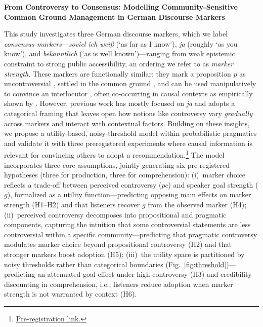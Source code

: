 \documentclass[12pt]{article}
\begin{document}
\noindent\textbf{\large From Controversy to Consensus: Modelling Community-Sensitive Common Ground Management in German Discourse Markers}


This study investigates three German discourse markers, which we label \emph{consensus markers}---\textit{soviel ich wei\ss} (`as far as I know'), \textit{ja} (roughly `as you know'), and \textit{bekanntlich} (`as is well known')---ranging from weak epistemic constraint to strong public accessibility, an ordering we refer to as \emph{marker strength}.
These markers are functionally similar: they mark a proposition $p$ as uncontroversial \citep{zimmermann2011discourse}, settled in the common ground \citep{repp2013common}, and can be used manipulatively to convince an interlocutor \citep{doring2016modal}, often co-occurring in causal contexts as empirically shown by \citep{seemann2025}.
However, previous work \citep[cf.][]{grosz2021discourse} has mostly focused on \textit{ja} and adopts a categorical framing that leaves open how notions like controversy vary \emph{gradually} across markers and interact with contextual factors.
Building on these insights, we propose a utility-based, noisy-threshold model within probabilistic pragmatics \citep{goodman2016pragmatic, franke2016probabilistic, degen2023rational} and validate it with three preregistered experiments where causal information is relevant for convincing others to adopt a recommendation.\footnote{\href{https://osf.io/8snhk/overview?view\_only=c11af15b84814625832957bd31f561bb}{Pre-registration link.}}
The model incorporates three core assumptions, jointly generating six pre-registered hypotheses (three for production, three for comprehension):
(i)~marker choice reflects a trade-off between perceived controversy ($pc$) and speaker goal strength ($g$), formalized as a utility function---predicting opposing main effects on marker strength (H1--H2) and that listeners recover $g$ from the observed marker (H4);
(ii)~perceived controversy decomposes into propositional and pragmatic components, capturing the intuition that some controversial statements are less controversial within a specific community---predicting that pragmatic controversy modulates marker choice beyond propositional controversy (H2) and that stronger markers boost adoption (H5);
(iii)~the utility space is partitioned by noisy thresholds rather than categorical boundaries (Fig.~\ref{fig:threshold})---predicting an attenuated goal effect under high controversy (H3) and credibility discounting in comprehension, i.e., listeners reduce adoption when marker strength is not warranted by context (H6).
\end{document}
